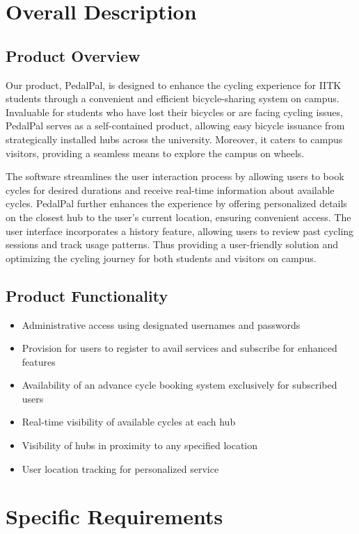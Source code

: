 \documentclass{scrreprt}
\begin{document}
\chapter{Overall Description}
\section{Product Overview}
Our product, PedalPal, is designed to enhance the cycling experience for IITK students through a convenient and efficient bicycle-sharing system on campus. Invaluable for students who have lost their bicycles or are facing cycling issues, PedalPal serves as a self-contained product, allowing easy bicycle issuance from strategically installed hubs across the university. Moreover, it caters to campus visitors, providing a seamless means to explore the campus on wheels. 

The software streamlines the user interaction process by allowing users to book cycles for desired durations and receive real-time information about available cycles. PedalPal further enhances the experience by offering personalized details on the closest hub to the user's current location, ensuring convenient access. The user interface incorporates a history feature, allowing users to review past cycling sessions and track usage patterns. Thus providing a user-friendly solution and optimizing the cycling journey for both students and visitors on campus.

\section{Product Functionality}
\begin{itemize}
    \item Administrative access using designated usernames and passwords
    \item Provision for users to register to avail services and subscribe for enhanced features
    \item Availability of an advance cycle booking system exclusively for subscribed users
    \item Real-time visibility of available cycles at each hub
    \item Visibility of hubs in proximity to any specified location
    \item User location tracking for personalized service
\end{itemize}

\chapter{Specific Requirements}
\end{document}
